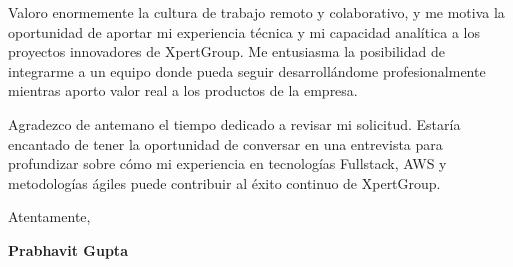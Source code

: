 \documentclass[11pt,a4paper]{article}
\begin{document}
\vspace{3mm}
\noindent Valoro enormemente la cultura de trabajo remoto y colaborativo, y me motiva la oportunidad de aportar mi experiencia técnica y mi capacidad analítica a los proyectos innovadores de XpertGroup. Me entusiasma la posibilidad de integrarme a un equipo donde pueda seguir desarrollándome profesionalmente mientras aporto valor real a los productos de la empresa.

\vspace{3mm}
\noindent Agradezco de antemano el tiempo dedicado a revisar mi solicitud. Estaría encantado de tener la oportunidad de conversar en una entrevista para profundizar sobre cómo mi experiencia en tecnologías Fullstack, AWS y metodologías ágiles puede contribuir al éxito continuo de XpertGroup.

\vspace{5mm}
\noindent Atentamente,

\vspace{5mm}
\noindent \textbf{Prabhavit Gupta}
\end{document}
